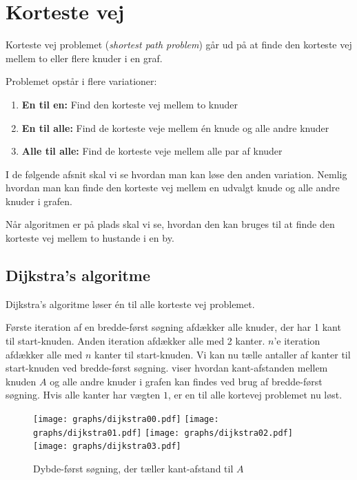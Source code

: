 \documentclass[10pt,a4paper,danish]{article}
\begin{document}
\section{Korteste vej}
\label{sec:shortest_path}

Korteste vej problemet (\textit{shortest path problem}) går ud på at
finde den korteste vej mellem to eller flere knuder i en
graf.

Problemet opstår i flere variationer:

\begin{enumerate}
\item \textbf{En til en:} Find den korteste vej mellem to knuder
\item \textbf{En til alle:} Find de korteste veje mellem \'en knude og
  alle andre knuder
\item \textbf{Alle til alle:} Find de korteste veje mellem alle par af
  knuder
\end{enumerate}

I de følgende afsnit skal vi se hvordan man kan løse den anden
variation. Nemlig hvordan man kan finde den korteste vej mellem en
udvalgt knude og alle andre knuder i grafen.

Når algoritmen er på plads skal vi se, hvordan den kan bruges til at
finde den korteste vej mellem to hustande i en by.


\subsection{Dijkstra's algoritme}

Dijkstra's algoritme løser \'en til alle korteste vej
problemet.

Første iteration af en bredde-først søgning afdækker alle knuder, der
har 1 kant til start-knuden. Anden iteration afdækker alle med 2
kanter. $n$'e iteration afdækker alle med $n$ kanter til
start-knuden. Vi kan nu tælle antaller af kanter til start-knuden ved
bredde-først søgning.  viser hvordan
kant-afstanden mellem knuden $A$ og alle andre knuder i grafen kan
findes ved brug af bredde-først søgning. Hvis alle kanter har vægten
$1$, er en til alle kortevej problemet nu løst.

\begin{figure}[h]\centering
\texttt{[image: graphs/dijkstra00.pdf]}
\texttt{[image: graphs/dijkstra01.pdf]}
\texttt{[image: graphs/dijkstra02.pdf]}
\texttt{[image: graphs/dijkstra03.pdf]}
\caption{Dybde-først søgning, der tæller kant-afstand til $A$}
\label{fig:dijkstra0}
\end{figure}
\end{document}
